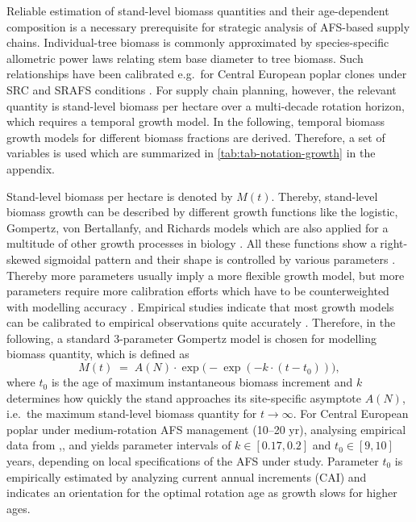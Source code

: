 \documentclass[APA,TimesLARGE]{WileyNJDv5} %
\begin{document}
Reliable estimation of stand-level biomass quantities and their age-dependent composition is a necessary prerequisite for strategic analysis of AFS-based supply chains. Individual-tree biomass is commonly approximated by species-specific allometric power laws relating stem base diameter to tree biomass. Such relationships have been calibrated e.g.~for Central European poplar clones under SRC and SRAFS conditions \cite{Huber2016_Allometric_SRAFS,Huber2018_SRAFS_growth}. For supply chain planning, however, the relevant quantity is stand-level biomass per hectare over a multi-decade rotation horizon, which requires a temporal growth model. In the following, temporal biomass growth models for different biomass fractions are derived. Therefore, a set of variables is used which are summarized in \autoref{tab:tab-notation-growth} in the appendix.

Stand-level biomass per hectare is denoted by \(M(t)\). Thereby, stand-level biomass growth can be described by different growth functions like the logistic, Gompertz, von Bertallanfy, and Richards models which are also applied for a multitude of other growth processes in biology \cite{tjorve2010unified}. All these functions show a right-skewed sigmoidal pattern and their shape is controlled by various parameters \cite{tjorve2010unified}. Thereby more parameters usually imply a more flexible growth model, but more parameters require more calibration efforts which have to be counterweighted with modelling accuracy \cite{dieguez2006dynamic}. Empirical studies indicate that most growth models can be calibrated to empirical observations quite accurately \cite{BarrioAnta2008_Poplar_Growth}. Therefore, in the following, a standard 3-parameter Gompertz model \cite{Tjorve2017} is chosen for modelling biomass quantity, which is defined as
\begin{equation}
  M(t) \;=\; A(N) \cdot \exp\!\bigl(-\exp(-k \cdot (t - t_0))\bigr),
  \label{eq:gomp-stand}
\end{equation}
where \(t_0\) is the age of maximum instantaneous biomass increment and \(k\) determines how quickly the stand approaches its site-specific asymptote \(A(N)\), i.e.~the maximum stand-level biomass quantity for \(t \rightarrow \infty\). For Central European poplar under medium-rotation AFS management (10--20 yr), analysing empirical data from \cite{Huber2018_SRAFS_growth},\cite{Niemczyk2021_Poplar_Rotation}, and \cite{Jha2018_Poplar_AFS_Biomass} yields parameter intervals of \(k \in [0.17,0.2]\) and \(t_0 \in [9,10]\) years, depending on local specifications of the AFS under study. Parameter \(t_0\) is empirically estimated by analyzing current annual increments (CAI) and indicates an orientation for the optimal rotation age as growth slows for higher ages.
\end{document}
